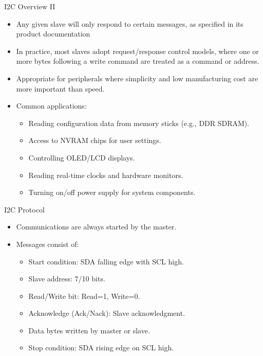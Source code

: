 \begin{frame}{I2C Overview II}
    \begin{itemize}
        \item Any given slave will only respond to certain messages, as specified in its product documentation
        \item In practice, most slaves adopt request/response control models, where one or more bytes following a write command are treated as a command or address.
        \item Appropriate for peripherals where simplicity and low manufacturing cost are more important than speed.
        \item Common applications:
        \begin{itemize}
            \item Reading configuration data from memory sticks (e.g., DDR SDRAM).
            \item Access to NVRAM chips for user settings.
            \item Controlling OLED/LCD displays.
            \item Reading real-time clocks and hardware monitors.
            \item Turning on/off power supply for system components.
        \end{itemize}
    \end{itemize}
\end{frame}

\begin{frame}{I2C Protocol}
    \begin{itemize}
        \item Communications are always started by the master.
        \item Messages consist of:
        \begin{itemize}
            \item Start condition: SDA falling edge with SCL high.
            \item Slave address: 7/10 bits.
            \item Read/Write bit: Read=1, Write=0.
            \item Acknowledge (Ack/Nack): Slave acknowledgment.
            \item Data bytes written by master or slave.
            \item Stop condition: SDA rising edge on SCL high.
        \end{itemize}
    \end{itemize}
\end{frame}


